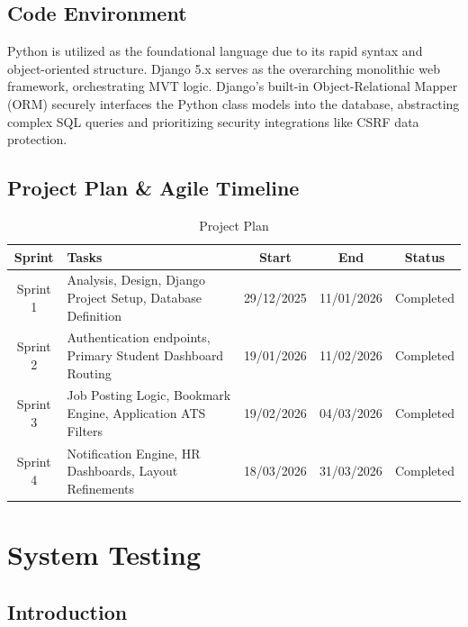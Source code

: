 \documentclass[a4paper,12pt]{report}
\begin{document}
\section{Code Environment}

Python is utilized as the foundational language due to its rapid syntax and object-oriented structure. Django 5.x serves as the overarching monolithic web framework, orchestrating MVT logic. Django's built-in Object-Relational Mapper (ORM) securely interfaces the Python class models into the database, abstracting complex SQL queries and prioritizing security integrations like CSRF data protection.

\section{Project Plan \& Agile Timeline}

\begin{table}[H]
\centering
\caption{Project Plan}
\vspace{8pt}
\label{tab:projectplan}
\renewcommand{\arraystretch}{1.3}
\begin{tabular}{|c|p{6cm}|c|c|c|}
\hline
\textbf{Sprint} & \textbf{Tasks} & \textbf{Start} & \textbf{End} & \textbf{Status} \\
\hline
Sprint 1 & Analysis, Design, Django Project Setup, Database Definition & 29/12/2025 & 11/01/2026 & Completed \\
Sprint 2 & Authentication endpoints, Primary Student Dashboard Routing & 19/01/2026 & 11/02/2026 & Completed \\
Sprint 3 & Job Posting Logic, Bookmark Engine, Application ATS Filters & 19/02/2026 & 04/03/2026 & Completed \\
Sprint 4 & Notification Engine, HR Dashboards, Layout Refinements & 18/03/2026 & 31/03/2026 & Completed \\
\hline
\end{tabular}
\end{table}

\chapter{System Testing}

\section{Introduction}
\end{document}
